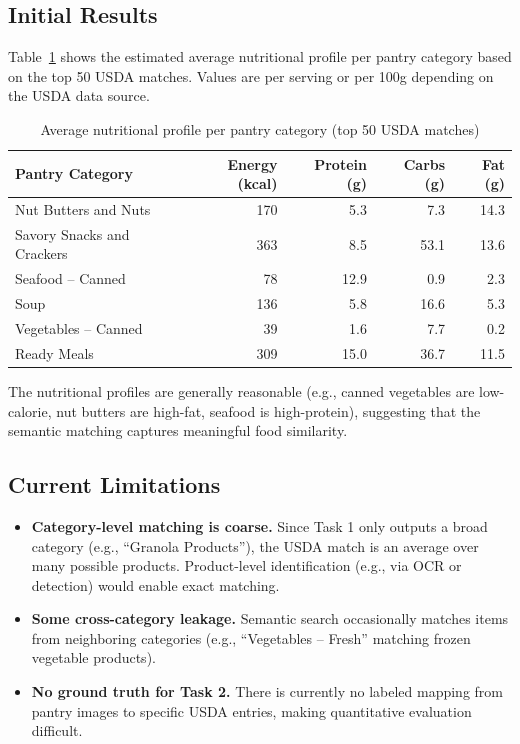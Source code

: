 \subsection{Initial Results}

Table~\ref{tab:task2nutrition} shows the estimated average nutritional profile per pantry category based on the top 50 USDA matches. Values are per serving or per 100g depending on the USDA data source.

\begin{table}[h]
\centering
\caption{Average nutritional profile per pantry category (top 50 USDA matches)}
\label{tab:task2nutrition}
\small
\begin{tabular}{lrrrr}
\toprule
Pantry Category & Energy (kcal) & Protein (g) & Carbs (g) & Fat (g) \\
\midrule
Nut Butters and Nuts & 170 & 5.3 & 7.3 & 14.3 \\
Savory Snacks and Crackers & 363 & 8.5 & 53.1 & 13.6 \\
Seafood -- Canned & 78 & 12.9 & 0.9 & 2.3 \\
Soup & 136 & 5.8 & 16.6 & 5.3 \\
Vegetables -- Canned & 39 & 1.6 & 7.7 & 0.2 \\
Ready Meals & 309 & 15.0 & 36.7 & 11.5 \\
\bottomrule
\end{tabular}
\end{table}

The nutritional profiles are generally reasonable (e.g., canned vegetables are low-calorie, nut butters are high-fat, seafood is high-protein), suggesting that the semantic matching captures meaningful food similarity.

\subsection{Current Limitations}

\begin{itemize}[nosep,leftmargin=1.5em]
 \item \textbf{Category-level matching is coarse.} Since Task 1 only outputs a broad category (e.g., ``Granola Products''), the USDA match is an average over many possible products. Product-level identification (e.g., via OCR or detection) would enable exact matching.
 \item \textbf{Some cross-category leakage.} Semantic search occasionally matches items from neighboring categories (e.g., ``Vegetables -- Fresh'' matching frozen vegetable products).
 \item \textbf{No ground truth for Task 2.} There is currently no labeled mapping from pantry images to specific USDA entries, making quantitative evaluation difficult.
\end{itemize}

